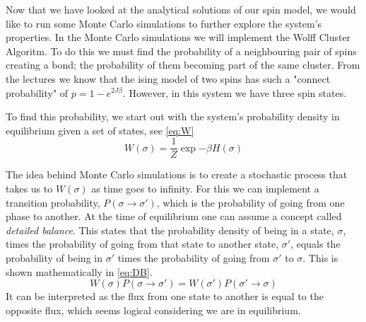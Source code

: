 Now that we have looked at the analytical solutions of our spin model, we would like to run some Monte Carlo simulations to further explore the system's properties. In the Monte Carlo simulations we will implement the Wolff Cluster Algoritm. To do this we must find the probability of a neighbouring pair of spins creating a bond; the probability of them becoming part of the same cluster. From the lectures we know that the ising model of two spins has such a "connect probability" of $p = 1 - e^{2 J \beta }$. However, in this system we have three spin states. 

To find this probability, we start out with the system's probability density in equilibrium given a set of states, see \cref{eq:W}  
\begin{equation}
    W(\sigma) = \frac{1}{Z} \exp{- \beta H(\sigma)}
    \label{eq:W}
\end{equation}

The idea behind Monte Carlo simulations is to create a stochastic process that takes us to $W(\sigma)$ as time goes to infinity. For this we can implement a transition probability, $P(\sigma \rightarrow \sigma')$, which is the probability of going from one phase to another. At the time of equilibrium one can assume a concept called \textit{detailed balance}. This states that the probability density of being in a state, $\sigma$, times the probability of going from that state to another state, $\sigma'$, equals the probability of being in $\sigma'$ times the probability of going from $\sigma'$ to $\sigma$. This is shown mathematically in \cref{eq:DB}. 
\begin{equation}
    W(\sigma)P(\sigma \rightarrow \sigma') = W(\sigma')P(\sigma' \rightarrow \sigma)
    \label{eq:DB}
\end{equation} 
It can be interpreted as the flux from one state to another is equal to the opposite flux, which seems logical considering we are in equilibrium. 

